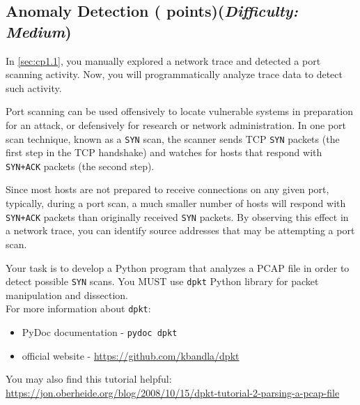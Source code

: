 \newpage

\subsection{Anomaly Detection ( points)\hfill\rm\normalsize (\emph{Difficulty: Medium})}
\label{sec:cp2.2}
\newcommand{\fileanomaly}{\ref*{sec:cp2.2}.py}

In \ref{sec:cp1.1}, you manually explored a network trace and detected a port scanning activity.
Now, you will programmatically analyze trace data to detect such activity.

\medskip

Port scanning can be used offensively to locate vulnerable systems in preparation for an attack, or defensively for research or network administration.
In one port scan technique, known as a \texttt{SYN} scan, the scanner sends TCP \texttt{SYN} packets (the first step in the TCP handshake) and watches for hosts that respond with \texttt{SYN+ACK} packets (the second step).

\medskip

Since most hosts are not prepared to receive connections on any given port, typically, during a port scan, a much smaller number of hosts will respond with \texttt{SYN+ACK} packets than originally received \texttt{SYN} packets.
By observing this effect in a network trace, you can identify source addresses that may be attempting a port scan.

\medskip

Your task is to develop a Python program that analyzes a PCAP file in order to detect possible \texttt{SYN} scans.
You MUST use \texttt{dpkt} Python library for packet manipulation and dissection.\\
For more information about \texttt{dpkt}:
\begin{itemize}[nosep]
  \item PyDoc documentation - \texttt{pydoc dpkt}
  \item official website - \url{https://github.com/kbandla/dpkt}
\end{itemize}
You may also find this tutorial helpful:\\
\url{https://jon.oberheide.org/blog/2008/10/15/dpkt-tutorial-2-parsing-a-pcap-file}

\medskip

